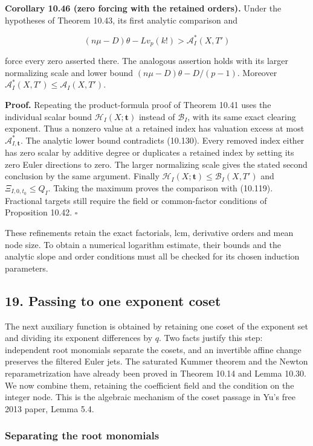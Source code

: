 \documentclass[
  11pt,
  a4paper,
]{article}
\begin{document}
\textbf{Corollary 10.46 (zero forcing with the retained orders).} Under
the hypotheses of Theorem 10.43, its first analytic comparison and

\[
(n\mu-D)\theta-Lv_p(k!)>\mathcal A_I^*(X,T')
\tag{10.130}
\]

force every zero asserted there. The analogous assertion holds with its
larger normalizing scale and lower bound \((n\mu-D)\theta-D/(p-1)\).
Moreover \(\mathcal A_I^*(X,T')\le\mathcal A_I(X,T')\).

\textbf{Proof.} Repeating the product-formula proof of Theorem 10.41
uses the individual scalar bound \(\mathcal H_I(X;\boldsymbol t)\)
instead of \(\mathcal B_I\), with its same exact clearing exponent. Thus
a nonzero value at a retained index has valuation excess at most
\(\mathcal A_{I,\boldsymbol t}^*\). The analytic lower bound contradicts
(10.130). Every removed index either has zero scalar by additive degree
or duplicates a retained index by setting its zero Euler directions to
zero. The larger normalizing scale gives the stated second conclusion by
the same argument. Finally
\(\mathcal H_I(X;\boldsymbol t)\le\mathcal B_I(X,T')\) and
\(\Xi_{I,0,t_0}\le Q_I\). Taking the maximum proves the comparison with
(10.119). Fractional targets still require the field or common-factor
conditions of Proposition 10.42. \(\square\)

These refinements retain the exact factorials, lcm, derivative orders
and mean node size. To obtain a numerical logarithm estimate, their
bounds and the analytic slope and order conditions must all be checked
for its chosen induction parameters.

\subsection{19. Passing to one exponent
coset}\label{passing-to-one-exponent-coset}

The next auxiliary function is obtained by retaining one coset of the
exponent set and dividing its exponent differences by \(q\). Two facts
justify this step: independent root monomials separate the cosets, and
an invertible affine change preserves the filtered Euler jets. The
saturated Kummer theorem and the Newton reparametrization have already
been proved in Theorem 10.14 and Lemma 10.30. We now combine them,
retaining the coefficient field and the condition on the integer node.
This is the algebraic mechanism of the coset passage in Yu's free 2013
paper, Lemma 5.4.

\subsubsection{Separating the root
monomials}\label{separating-the-root-monomials}
\end{document}
